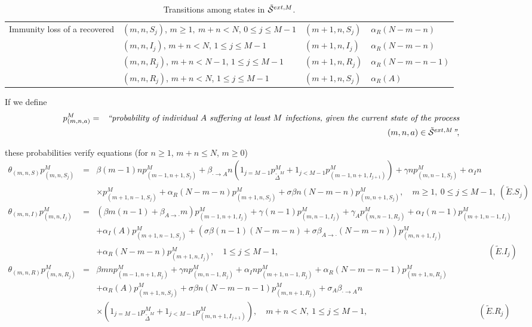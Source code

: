 \documentclass[10pt,A4paper]{article}
\begin{document}
\begin{table}[h]
\begin{tabular}{|l|l|l|l|}
\hline
Immunity loss of a recovered & $(m,n,S_j)$, $m\geq1,\ m+n<N$, $0\leq j\leq M-1$ & $(m+1,n,S_j)$ & $\alpha_R (N-m-n)$\\
 & $(m,n,I_j)$, $m+n<N$, $1\leq j\leq M-1$ & $(m+1,n,I_j)$ & $\alpha_R (N-m-n)$\\
 & $(m,n,R_j)$, $m+n<N-1$, $1\leq j\leq M-1$ & $(m+1,n,R_j)$ & $\alpha_R (N-m-n-1)$\\
 & $(m,n,R_j)$, $m+n<N$, $1\leq j\leq M-1$ & $(m+1,n,S_j)$ & $\alpha_R(A)$\\
\hline
\end{tabular}
\caption{Transitions among states in ${\cal \tilde S}^{ext,M}$.}
\label{tab:2new}
\end{table}

\par If we define
\begin{eqnarray*}
 p^M_{(m,n,a)} &=& \hbox{\it ``probability of individual $A$ suffering at least $M$ infections, given the current state of the process}\\
&& \hbox{\it $(m,n,a)\in{\cal \tilde S}^{ext,M}$''},
\end{eqnarray*}
\par\noindent these probabilities verify equations (for $n\geq1$, $m+n\leq N$, $m\geq0$)
\begin{eqnarray*}
 \theta_{(m,n,S)}p^M_{(m,n,S_j)} &=& \beta(m-1)np^M_{(m-1,n+1,S_j)}+\beta_{\cdot\rightarrow A}n\left(1_{j=M-1}p^M_{{\tilde \Delta}^M}+1_{j<M-1}p^M_{(m-1,n+1,I_{j+1})}\right)+\gamma np^M_{(m,n-1,S_j)}+\alpha_I n\\
&& \times p^M_{(m+1,n-1,S_j)}+\alpha_R(N-m-n)p^M_{(m+1,n,S_j)}+\sigma\beta n(N-m-n)p^M_{(m,n+1,S_j)},\quad m\geq1,\ 0\leq j\leq M-1,\ ({\tilde E}.S_j)\\
 \theta_{(m,n,I)}p^M_{(m,n,I_j)} &=& \left(\beta m(n-1)+\beta_{A\rightarrow\cdot}m\right)p^M_{(m-1,n+1,I_j)}+\gamma(n-1)p^M_{(m,n-1,I_j)}+\gamma_Ap^M_{(m,n-1,R_j)}+\alpha_I(n-1)p^M_{(m+1,n-1,I_j)}\\
&& +\alpha_I(A)p^M_{(m+1,n-1,S_j)}+\left(\sigma\beta(n-1)(N-m-n)+\sigma\beta_{A\rightarrow\cdot}(N-m-n)\right)p^M_{(m,n+1,I_j)}\\
&& +\alpha_R(N-m-n)p^M_{(m+1,n,I_j)},\quad 1\leq j\leq M-1,\quad\quad\quad\quad\quad\quad\quad\quad\quad\quad\quad\quad\quad\quad\quad\quad\quad\quad\quad\quad\quad\quad\quad\quad\quad ({\tilde E}.I_j)\\
 \theta_{(m,n,R)}p^M_{(m,n,R_j)} &=& \beta mnp^M_{(m-1,n+1,R_j)}+\gamma np^M_{(m,n-1,R_j)}+\alpha_I np^M_{(m+1,n-1,R_j)}+\alpha_R(N-m-n-1)p^M_{(m+1,n,R_j)}\\
&&+\alpha_R(A)p^M_{(m+1,n,S_j)}+\sigma\beta n(N-m-n-1)p^M_{(m,n+1,R_j)}+\sigma_A\beta_{\cdot\rightarrow A}n\\
&&\times\left(1_{j=M-1}p^M_{{\tilde \Delta}^M}+1_{j<M-1}p^M_{(m,n+1,I_{j+1})}\right),\quad m+n<N,\ 1\leq j \leq M-1,\quad\quad\quad\quad\quad\quad\quad\quad\quad\quad\quad\quad\quad\ ({\tilde E}.R_j)
\end{eqnarray*}
\end{document}
